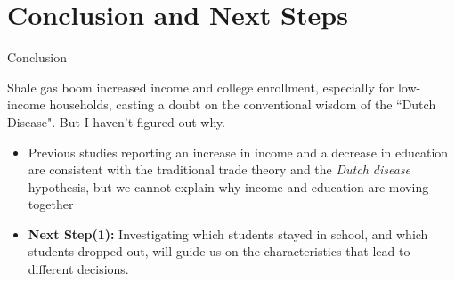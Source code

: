 \documentclass[12pt,  aspectratio=169]{beamer}    %
\begin{document}
\section{Conclusion  and  Next  Steps}
\begin{frame}{Conclusion}

Shale  gas  boom  increased  income  and  college  enrollment,  especially  for  low-income  households,  casting  a  doubt  on  the  conventional  wisdom  of  the  ``Dutch  Disease".  But  I  haven't  figured  out  why.  
    \begin{itemize}
        \item  Previous  studies  reporting  an  increase  in  income  and  a  decrease  in  education  are  consistent  with  the  traditional  trade  theory  and  the  \textit{Dutch  disease}  hypothesis,  but  we  cannot  explain  why  income  and  education  are  moving  together
        \item  \textbf{Next  Step(1):  }Investigating  which  students  stayed  in  school,  and  which  students  dropped  out,  will  guide  us  on  the  characteristics  that  lead  to  different  decisions.
    \end{itemize}

\end{frame}
\end{document}
